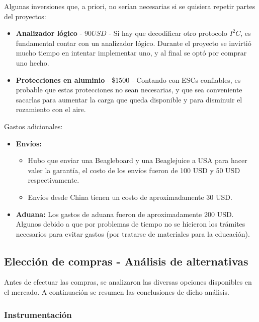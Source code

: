 \documentclass[main]{subfiles}
\begin{document}
Algunas inversiones que, a priori, no serían necesarias si se quisiera repetir partes del proyectos:

\begin{itemize}
\item \textbf{Analizador lógico} - $90 USD$ - Si hay que decodificar otro protocolo $I^2C$, es fundamental contar con un analizador lógico. Durante el proyecto se invirtió mucho tiempo en intentar implementar uno, y al final se optó por comprar uno hecho.
\item \textbf{Protecciones en aluminio} - \$1500 - Contando con ESCs confiables, es probable que estas protecciones no sean necesarias, y que sea conveniente sacarlas para aumentar la carga que queda disponible y para disminuir el rozamiento con el aire.
\end{itemize}

Gastos adicionales:

\begin{itemize}
\item \textbf{Envíos:}
  \begin{itemize}
  \item Hubo que enviar una Beagleboard y una Beaglejuice a USA para hacer valer la garantía, el costo de los envíos fueron de 100 USD y 50 USD respectivamente.
  \item Envíos desde China tienen un costo de aproximadamente 30 USD.
  \end{itemize}
\item \textbf{Aduana:} Los gastos de aduana fueron de aproximadamente 200 USD. Algunos debido a que por problemas de tiempo no se hicieron los trámites necesarios para evitar gastos (por tratarse de materiales para la educación).
\end{itemize}

\subsection{Elección de compras - Análisis de alternativas}
\label{sec:anexo_costos-analisis-de-alternativas}

Antes de efectuar las compras, se analizaron las diversas opciones disponibles en el mercado. A continuación se resumen las conclusiones de dicho análisis.

\subsubsection{Instrumentación}
\label{sec:costos-instrumentacion}
\end{document}
